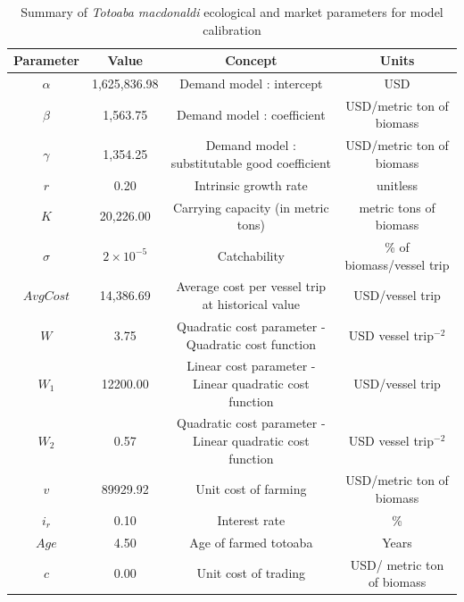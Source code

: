\begin{landscape}

\begin{table}[h]
\centering
\begin{tabular}[t]{c c c c}
\hline
Parameter & Value & Concept & Units\\
\hline \hline
$\alpha$ & 1,625,836.98 & Demand model : intercept & USD\\

$\beta$ & 1,563.75 & Demand model : coefficient & USD/metric ton of biomass\\

$\gamma$ & 1,354.25 & Demand model : substitutable good coefficient & USD/metric ton of biomass\\

\hline

$r$ & 0.20 & Intrinsic growth rate & unitless\\

$K$ & 20,226.00 & Carrying capacity (in metric tons) & metric tons of biomass\\

\hline 

$\sigma$ & $2\times 10^{-5}$ & Catchability & \% of biomass/vessel trip\\

$Avg Cost$ & 14,386.69 & Average cost per vessel trip at historical value & USD/vessel trip\\

$W$ & 3.75 & Quadratic cost parameter - Quadratic cost function & USD vessel trip$^{-2}$\\

$W_1$ & 12200.00 & Linear cost parameter - Linear quadratic cost function & USD/vessel trip\\

$W_2$ & 0.57 & Quadratic cost parameter - Linear quadratic cost function & USD vessel trip$^{-2}$\\

\hline 

$v$ & 89929.92 & Unit cost of farming & USD/metric ton of biomass\\

$i_r$ & 0.10 & Interest rate & \%\\

$Age$ & 4.50 & Age of farmed totoaba & Years\\
\hline 
$c$ & 0.00 & Unit cost of trading & USD/ metric ton of biomass\\
\hline \hline
\end{tabular}

\caption{Summary of \textit{Totoaba macdonaldi} ecological and market parameters for model calibration}
\label{tab:params}
\end{table}
\end{landscape}
\newpage

